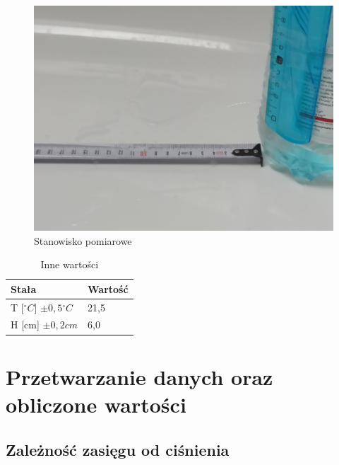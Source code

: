 \documentclass[a4paper,12pt]{article}
\newcommand{\stopnie}{\ensuremath{^{\circ}}}
\begin{document}
\begin{figure}[hbt]
	\includegraphics[scale=.05]{stanowisko.jpg}
	\centering
	\caption{Stanowisko pomiarowe}
\end{figure}

\begin{table}[hbt]
\centering
\begin{tabular}{|l|l|}
\hline
Stała                                 & Wartość \\ \hline\hline
T [$\stopnie C$] $\pm 0,5 \stopnie C$ & 21,5    \\ \hline
H [cm] $\pm 0,2cm$                    & 6,0     \\ \hline
\end{tabular}
\caption{Inne wartości}
\label{tab:stale}
\end{table}

\clearpage

\section{Przetwarzanie danych oraz obliczone wartości}

\subsection*{Zależność zasięgu od ciśnienia}
\end{document}
